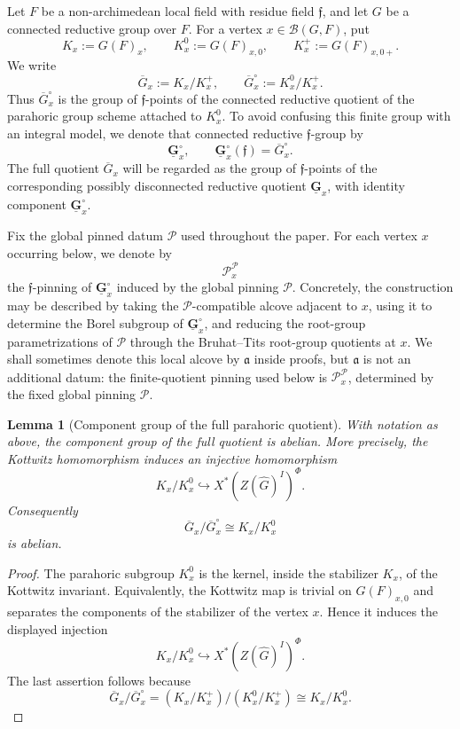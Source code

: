 \documentclass{amsart}
\theoremstyle{plain}
\numberwithin{equation}{section}
\newtheorem{lemma}[theorem]{Lemma}
\theoremstyle{definition}
\newcommand{\cP}{\mathcal{P}}
\newcommand{\ff}{\mathfrak{f}}
\begin{document}
Let \(F\) be a non-archimedean local field with residue field \(\ff\), and let
\(G\) be a connected reductive group over \(F\).  For a vertex
\(x\in\mathcal B(G,F)\), put
\[
        K_x:=G(F)_x,\qquad
        K_x^0:=G(F)_{x,0},\qquad
        K_x^+:=G(F)_{x,0+}.
\]
We write
\[
        \overline G_x:=K_x/K_x^+,
        \qquad
        \overline G_x^\circ:=K_x^0/K_x^+ .
\]
Thus \(\overline G_x^\circ\) is the group of \(\ff\)-points of the connected
reductive quotient of the parahoric group scheme attached to \(K_x^0\).  To avoid
confusing this finite group with an integral model, we denote that connected
reductive \(\ff\)-group by
\[
        \underline{\mathbf G}_x^\circ,
        \qquad
        \underline{\mathbf G}_x^\circ(\ff)=\overline G_x^\circ .
\]
The full quotient \(\overline G_x\) will be regarded as the group of \(\ff\)-points
of the corresponding possibly disconnected reductive quotient
\(\underline{\mathbf G}_x\), with identity component
\(\underline{\mathbf G}_x^\circ\).

Fix the global pinned datum \(\cP\) used throughout the paper.  For each
vertex \(x\) occurring below, we denote by
\[
        \cP_x^{\cP}
\]
the \(\ff\)-pinning of \(\underline{\mathbf G}_x^\circ\) induced by the global
pinning \(\cP\).  Concretely, the construction may be described by taking the
\(\cP\)-compatible alcove adjacent to \(x\), using it to determine the Borel
subgroup of \(\underline{\mathbf G}_x^\circ\), and reducing the root-group
parametrizations of \(\cP\) through the Bruhat--Tits root-group quotients at
\(x\).  We shall sometimes denote this local alcove by \(\mathfrak a\) inside
proofs, but \(\mathfrak a\) is not an additional datum: the finite-quotient
pinning used below is \(\cP_x^{\cP}\), determined by the fixed global pinning
\(\cP\).

\begin{lemma}[Component group of the full parahoric quotient]
\label{lem:parahoric-component-abelian}
With notation as above, the component group of the full quotient is abelian.  More
precisely, the Kottwitz homomorphism induces an injective homomorphism
\[
        K_x/K_x^0
        \hookrightarrow
        X^*(Z(\widehat G)^I)^\Phi .
\]
Consequently
\[
        \overline G_x/\overline G_x^\circ
        \cong
        K_x/K_x^0
\]
is abelian.
\end{lemma}

\begin{proof}
The parahoric subgroup \(K_x^0\) is the kernel, inside the stabilizer \(K_x\), of
the Kottwitz invariant.  Equivalently, the Kottwitz map is trivial on
\(G(F)_{x,0}\) and separates the components of the stabilizer of the vertex
\(x\).  Hence it induces the displayed injection
\[
        K_x/K_x^0\hookrightarrow X^*(Z(\widehat G)^I)^\Phi .
\]
The last assertion follows because
\[
        \overline G_x/\overline G_x^\circ
        =(K_x/K_x^+)/(K_x^0/K_x^+)
        \cong K_x/K_x^0 .
\]
\end{proof}
\end{document}
